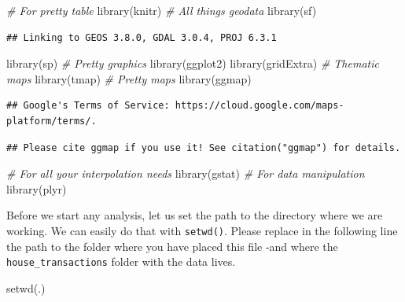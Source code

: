 \documentclass[
]{book}
\newenvironment{Shaded}{\begin{snugshade}}{\end{snugshade}}
\newcommand{\CommentTok}[1]{\textcolor[rgb]{0.56,0.35,0.01}{\textit{#1}}}
\newcommand{\FunctionTok}[1]{\textcolor[rgb]{0.00,0.00,0.00}{#1}}
\newcommand{\NormalTok}[1]{#1}
\newcommand{\StringTok}[1]{\textcolor[rgb]{0.31,0.60,0.02}{#1}}
\begin{document}
\begin{Shaded}
\begin{Highlighting}[]
\CommentTok{\# For pretty table}
\FunctionTok{library}\NormalTok{(knitr)}
\CommentTok{\# All things geodata}
\FunctionTok{library}\NormalTok{(sf)}
\end{Highlighting}
\end{Shaded}

\begin{verbatim}
## Linking to GEOS 3.8.0, GDAL 3.0.4, PROJ 6.3.1
\end{verbatim}

\begin{Shaded}
\begin{Highlighting}[]
\FunctionTok{library}\NormalTok{(sp)}
\CommentTok{\# Pretty graphics}
\FunctionTok{library}\NormalTok{(ggplot2)}
\FunctionTok{library}\NormalTok{(gridExtra)}
\CommentTok{\# Thematic maps}
\FunctionTok{library}\NormalTok{(tmap)}
\CommentTok{\# Pretty maps}
\FunctionTok{library}\NormalTok{(ggmap)}
\end{Highlighting}
\end{Shaded}

\begin{verbatim}
## Google's Terms of Service: https://cloud.google.com/maps-platform/terms/.
\end{verbatim}

\begin{verbatim}
## Please cite ggmap if you use it! See citation("ggmap") for details.
\end{verbatim}

\begin{Shaded}
\begin{Highlighting}[]
\CommentTok{\# For all your interpolation needs}
\FunctionTok{library}\NormalTok{(gstat)}
\CommentTok{\# For data manipulation}
\FunctionTok{library}\NormalTok{(plyr)}
\end{Highlighting}
\end{Shaded}

Before we start any analysis, let us set the path to the directory where we are working. We can easily do that with \texttt{setwd()}. Please replace in the following line the path to the folder where you have placed this file -and where the \texttt{house\_transactions} folder with the data lives.

\begin{Shaded}
\begin{Highlighting}[]
\FunctionTok{setwd}\NormalTok{(}\StringTok{\textquotesingle{}.\textquotesingle{}}\NormalTok{)}
\end{Highlighting}
\end{Shaded}
\end{document}
